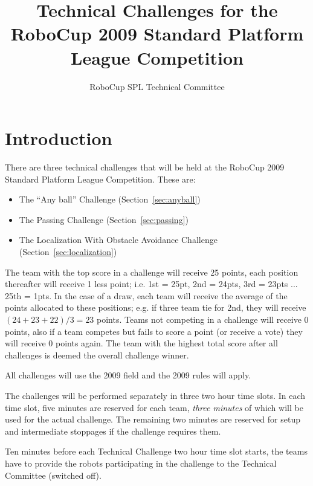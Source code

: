 \documentclass{article}
\begin{document}
\title{Technical Challenges for the RoboCup 2009 Standard Platform League Competition}

\author{RoboCup SPL Technical Committee}

\maketitle

\section{Introduction}

There are three technical challenges that will be held at the RoboCup 2009 Standard Platform League Competition. These are:

\begin{itemize}
\item The ``Any ball'' Challenge (Section~\ref{sec:anyball})
\item The Passing Challenge (Section~\ref{sec:passing})
\item The Localization With Obstacle Avoidance Challenge (Section~\ref{sec:localization})
\end{itemize}

The team with the top score in a challenge will receive 25 points, each position thereafter will receive 1 less point; i.e. 1st = 25pt, 2nd = 24pts, 3rd = 23pts ... 25th = 1pts. In the case of a draw, each team will receive the average of the points allocated to these positions; e.g. if three team tie for 2nd, they will receive $(24+23+22)/3 = 23$ points. Teams not competing in a challenge will receive 0 points, also if a team competes but fails to score a point (or receive a vote) they will receive 0 points again. The team with the highest total score after all challenges is deemed the overall challenge winner.

All challenges will use the 2009 field and the 2009 rules will apply.

The challenges will be performed separately in three two hour time slots. In each time slot, five minutes are reserved for each team, \emph{three minutes} of which will be used for the actual challenge. The remaining two minutes are reserved for setup and intermediate stoppages if the challenge requires them.

Ten minutes before each Technical Challenge two hour time slot starts, the teams have to provide the robots participating in the challenge to the Technical Committee (switched off).
\end{document}
